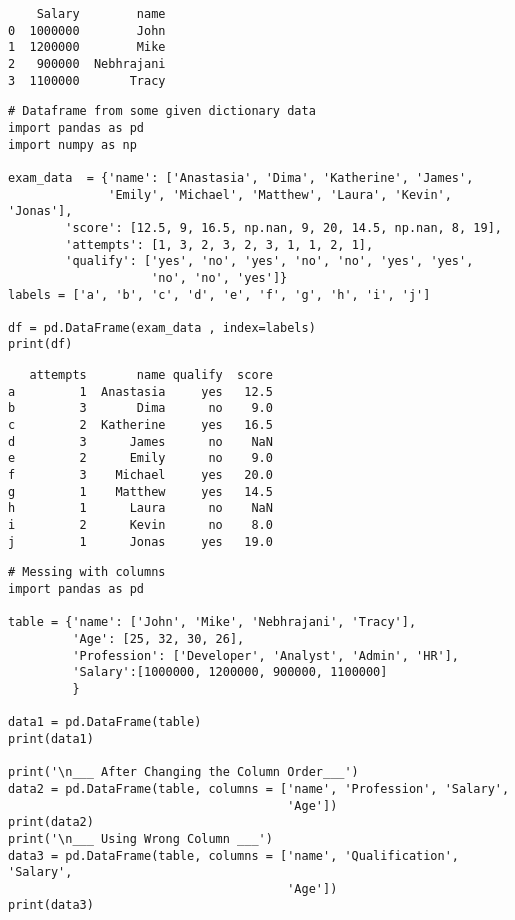 \documentclass[11pt]{article}
\begin{document}
\begin{verbatim}
    Salary        name
0  1000000        John
1  1200000        Mike
2   900000  Nebhrajani
3  1100000       Tracy
\end{verbatim}


\begin{verbatim}
# Dataframe from some given dictionary data
import pandas as pd
import numpy as np

exam_data  = {'name': ['Anastasia', 'Dima', 'Katherine', 'James',
              'Emily', 'Michael', 'Matthew', 'Laura', 'Kevin', 'Jonas'],
        'score': [12.5, 9, 16.5, np.nan, 9, 20, 14.5, np.nan, 8, 19],
        'attempts': [1, 3, 2, 3, 2, 3, 1, 1, 2, 1],
        'qualify': ['yes', 'no', 'yes', 'no', 'no', 'yes', 'yes',
                    'no', 'no', 'yes']}
labels = ['a', 'b', 'c', 'd', 'e', 'f', 'g', 'h', 'i', 'j']

df = pd.DataFrame(exam_data , index=labels)
print(df)
\end{verbatim}

\begin{verbatim}
   attempts       name qualify  score
a         1  Anastasia     yes   12.5
b         3       Dima      no    9.0
c         2  Katherine     yes   16.5
d         3      James      no    NaN
e         2      Emily      no    9.0
f         3    Michael     yes   20.0
g         1    Matthew     yes   14.5
h         1      Laura      no    NaN
i         2      Kevin      no    8.0
j         1      Jonas     yes   19.0
\end{verbatim}

\begin{verbatim}
# Messing with columns
import pandas as pd

table = {'name': ['John', 'Mike', 'Nebhrajani', 'Tracy'],
         'Age': [25, 32, 30, 26],
         'Profession': ['Developer', 'Analyst', 'Admin', 'HR'],
         'Salary':[1000000, 1200000, 900000, 1100000]
         }

data1 = pd.DataFrame(table)
print(data1)

print('\n___ After Changing the Column Order___')
data2 = pd.DataFrame(table, columns = ['name', 'Profession', 'Salary',
                                       'Age'])
print(data2)
print('\n___ Using Wrong Column ___')
data3 = pd.DataFrame(table, columns = ['name', 'Qualification', 'Salary',
                                       'Age'])
print(data3)
\end{verbatim}
\end{document}
